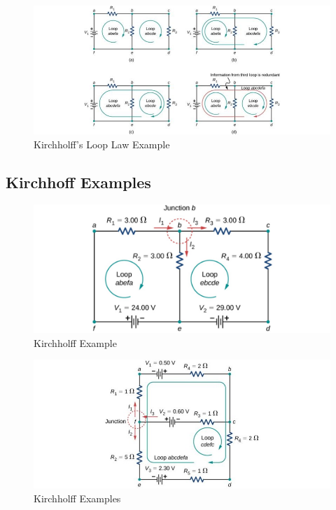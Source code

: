 \documentclass[14pt]{memoir}
\begin{document}
\begin{figure}[H]
\begin{center}
\includegraphics[scale=0.50]{fig/fig_10_25.jpg}
\caption{Kirchholff's Loop Law Example}
\label{fig:10_25}
\end{center}
\end{figure}

\subsection{Kirchhoff Examples}

\begin{figure}[H]
\begin{center}
\includegraphics[scale=0.50]{fig/fig_10_28.jpg}
\caption{Kirchholff Example}
\label{fig:10_28}
\end{center}
\end{figure}

\begin{figure}[H]
\begin{center}
\includegraphics[scale=0.50]{fig/fig_10_29.jpg}
\caption{Kirchholff Examples}
\label{fig:10_29}
\end{center}
\end{figure}
\end{document}
